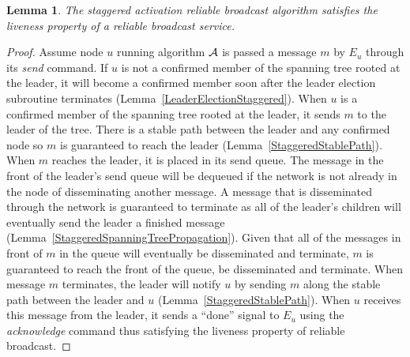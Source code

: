 \documentclass[english]{article}
\newtheorem{lemma}[theorem]{Lemma}
\begin{document}
\begin{lemma}
\label{StaggeredRBLiveness}
The staggered activation reliable broadcast algorithm satisfies the liveness property of a reliable broadcast service.
\end{lemma}
\begin{proof}

Assume node $u$ running algorithm $\cal A$ is passed a message $m$ by $E_u$ through its \textit{send} command. If $u$ is not a confirmed member of the spanning tree rooted at the leader, it will become a confirmed member soon after the leader election subroutine terminates (Lemma~\ref{LeaderElectionStaggered}). When $u$ is a confirmed member of the spanning tree rooted at the leader, it sends $m$ to the leader of the tree. There is a stable path between the leader and any confirmed node so $m$ is guaranteed to reach the leader (Lemma~\ref{StaggeredStablePath}). When $m$ reaches the leader, it is placed in its send queue. The message in the front of the leader's send queue will be dequeued if the network is not already in the node of disseminating another message. A message that is disseminated through the network is guaranteed to terminate as all of the leader's children will eventually send the leader a finished message (Lemma~\ref{StaggeredSpanningTreePropagation}). Given that all of the messages in front of $m$ in the queue will eventually be disseminated and terminate, $m$ is guaranteed to reach the front of the queue, be disseminated and terminate. When message $m$ terminates, the leader will notify $u$ by sending $m$ along the stable path between the leader and $u$ (Lemma~\ref{StaggeredStablePath}). When $u$ receives this message from the leader, it sends  a ``done'' signal to $E_u$ using the \textit{acknowledge} command thus satisfying the liveness property of reliable broadcast.


\end{proof}
\end{document}
